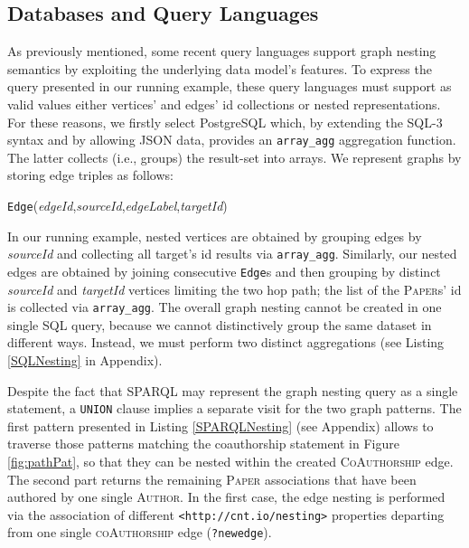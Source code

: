 \subsection{Databases and Query Languages}\label{subsec:pathsumm}
As previously mentioned, some recent  query languages support graph nesting semantics by exploiting the underlying data model's features. To express the query presented in our running example, these query languages must support as valid values  either vertices' and edges' id collections or nested representations.
For these reasons, we firstly select PostgreSQL which, by extending the SQL-3 syntax and by allowing JSON data, provides an \texttt{array\_agg} aggregation function. The latter collects (i.e., groups) the result-set into arrays.  We  represent  graphs by  storing edge triples as follows:\begin{center}
 \texttt{Edge}(\textit{edgeId},\;\textit{sourceId},\;\textit{edgeLabel},\;\textit{targetId})
\end{center} In our running example, nested vertices  are obtained by 
grouping edges by \textit{sourceId} and collecting all target's id results via \texttt{array\_agg}. Similarly, our nested edges are obtained by joining consecutive \texttt{Edge}s and then grouping  by  distinct \textit{sourceId} and \textit{targetId}  vertices limiting the two hop path; the list of the \textsc{Paper}s' id is collected via \texttt{array\_agg}. The overall graph nesting cannot be created in one single SQL query, because we cannot distinctively group the same dataset in different ways. Instead, we must perform two distinct aggregations (see Listing \ref{SQLNesting} in Appendix).


Despite the fact that SPARQL  may represent the graph nesting query as a single statement, a \texttt{UNION} clause implies a separate visit for the two graph patterns. The first pattern presented in Listing \ref{SPARQLNesting} (see Appendix) allows to traverse those  patterns matching the coauthorship statement in Figure \ref{fig:pathPat}, so that they can be nested within the created \textsc{CoAuthorship} edge. The second part returns the remaining \textsc{Paper} associations that have been authored by one single \textsc{Author}. In the first case, the edge nesting is performed via the association of different \texttt{<http://cnt.io/nesting>} properties departing from one single  \textsc{coAuthorship} edge (\texttt{?newedge}).

